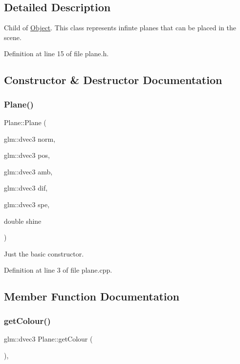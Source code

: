 \subsection{Detailed Description}
Child of \mbox{\hyperlink{class_object}{Object}}. This class represents infinte planes that can be placed in the scene. 

Definition at line 15 of file plane.\+h.



\subsection{Constructor \& Destructor Documentation}
\mbox{\label{class_plane_aeb002db84ff90de81df472544c35dbca}} 
\subsubsection{\texorpdfstring{Plane()}{Plane()}}
{\footnotesize\ttfamily Plane\+::\+Plane (\begin{DoxyParamCaption}\item[{glm\+::dvec3}]{norm,  }\item[{glm\+::dvec3}]{pos,  }\item[{glm\+::dvec3}]{amb,  }\item[{glm\+::dvec3}]{dif,  }\item[{glm\+::dvec3}]{spe,  }\item[{double}]{shine }\end{DoxyParamCaption})}



Just the basic constructor. 



Definition at line 3 of file plane.\+cpp.



\subsection{Member Function Documentation}
\mbox{\label{class_plane_acd86caefd4ff1bf35f2719b1bef6afd8}} 
\subsubsection{\texorpdfstring{get\+Colour()}{getColour()}\hspace{0.1cm}{\footnotesize\ttfamily [1/2]}}
{\footnotesize\ttfamily glm\+::dvec3 Plane\+::get\+Colour (\begin{DoxyParamCaption}{ }\end{DoxyParamCaption})\hspace{0.3cm}{\ttfamily [override]}, {\ttfamily [virtual]}}



